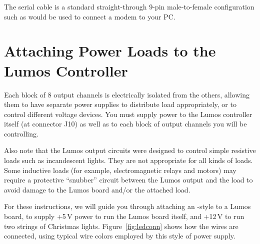 \documentclass[letterpaper,twoside,onecolumn,openright,final]{memoir}
\begin{document}
The serial cable is a standard straight-through 9-pin male-to-female configuration such as would be used
to connect a modem to your PC.

\section{Attaching Power Loads to the Lumos Controller}
Each block of 8 output channels is electrically isolated from the others, allowing them to have
separate power supplies to distribute load appropriately, or to control different voltage devices.
You must supply power to the Lumos controller itself (at connector J10) as well as to each block of 
output channels you will be controlling.

Also note that the Lumos output circuits were designed to control simple resistive loads such as
incandescent lights.  They are not appropriate for all kinds of loads.  Some inductive loads
(for example, electromagnetic relays and motors) may require a protective ``snubber'' circuit
between the Lumos output and the load to avoid damage to the Lumos board and/or the attached load.

For these instructions, we will guide you through attaching an -style  to a 
Lumos board, to supply +5\,V power to run the Lumos board itself, and +12\,V to run two strings of 
Christmas lights.  Figure~\ref{fig:ledconn} shows how the wires are connected, using typical wire colors
employed by this style of power supply.
\end{document}
